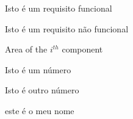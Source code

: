 \begin{siglas}
  \item[RF] Isto é um requisito funcional
  \item[RNF] Isto é um requisito não funcional
  \item[Fig.] Area of the $i^{th}$ component
  \item[456] Isto é um número
  \item[123] Isto é outro número
  \item[lauro cesar] este é o meu nome
\end{siglas}
